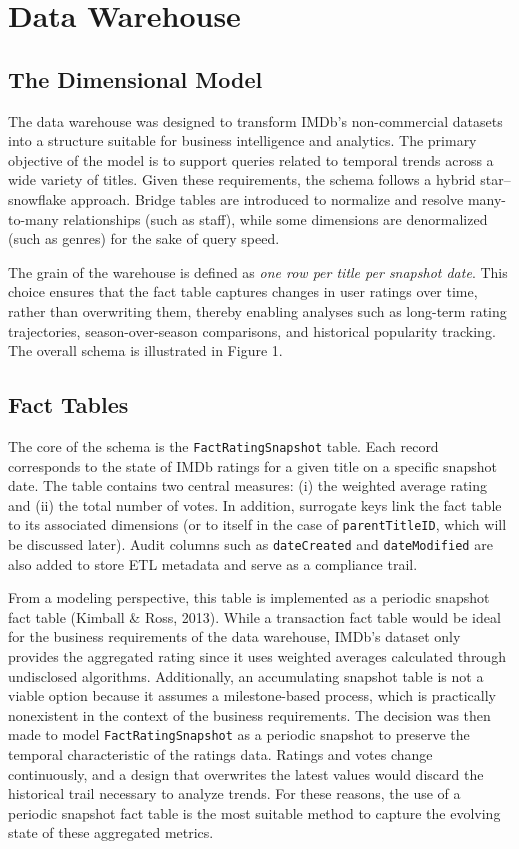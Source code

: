 \section{Data Warehouse}

\subsection{The Dimensional Model}

The data warehouse was designed to transform IMDb’s non-commercial datasets into a structure suitable for business intelligence and analytics. The primary objective of the model is to support queries related to temporal trends across a wide variety of titles. Given these requirements, the schema follows a hybrid star–snowflake approach. Bridge tables are introduced to normalize and resolve many-to-many relationships (such as staff), while some dimensions are denormalized (such as genres) for the sake of query speed.

The grain of the warehouse is defined as \textit{one row per title per snapshot date}. This choice ensures that the fact table captures changes in user ratings over time, rather than overwriting them, thereby enabling analyses such as long-term rating trajectories, season-over-season comparisons, and historical popularity tracking. The overall schema is illustrated in Figure 1.

\subsection{Fact Tables}

The core of the schema is the \verb|FactRatingSnapshot| table. Each record corresponds to the state of IMDb ratings for a given title on a specific snapshot date. The table contains two central measures: (i) the weighted average rating and (ii) the total number of votes. In addition, surrogate keys link the fact table to its associated dimensions (or to itself in the case of \verb|parentTitleID|, which will be discussed later). Audit columns such as \verb|dateCreated| and \verb|dateModified| are also added to store ETL metadata and serve as a compliance trail.

From a modeling perspective, this table is implemented as a periodic snapshot fact table (Kimball \& Ross, 2013). While a transaction fact table would be ideal for the business requirements of the data warehouse, IMDb's dataset only provides the aggregated rating since it uses weighted averages calculated through undisclosed algorithms. Additionally, an accumulating snapshot table is not a viable option because it assumes a milestone-based process, which is practically nonexistent in the context of the business requirements. The decision was then made to model \verb|FactRatingSnapshot| as a periodic snapshot to preserve the temporal characteristic of the ratings data. Ratings and votes change continuously, and a design that overwrites the latest values would discard the historical trail necessary to analyze trends. For these reasons, the use of a periodic snapshot fact table is the most suitable method to capture the evolving state of these aggregated metrics.


